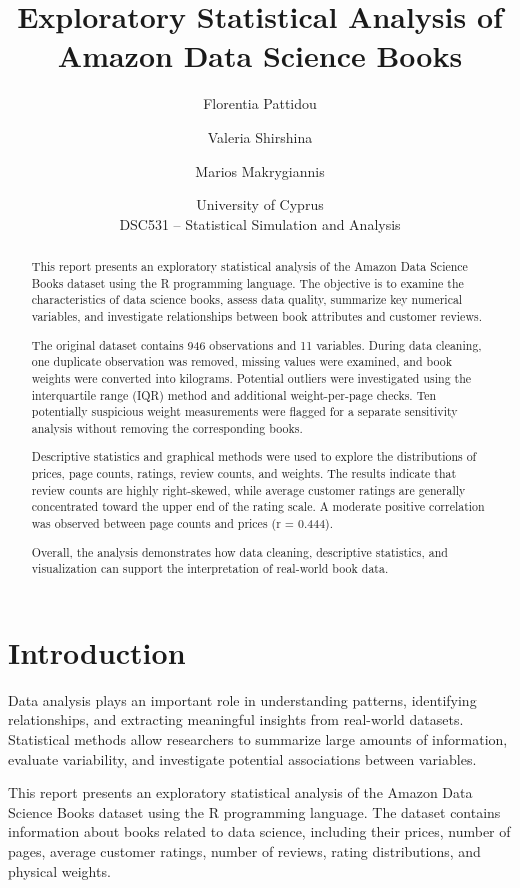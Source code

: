 \documentclass[11pt,a4paper]{article}
\title{Exploratory Statistical Analysis of
Amazon Data Science Books}
\author{
Florentia Pattidou \and
Valeria Shirshina \and
Marios Makrygiannis
}
\date{University of Cyprus\\
DSC531 -- Statistical Simulation and Analysis}
\begin{document}
\maketitle
\newpage
\begin{abstract}
This report presents an exploratory statistical analysis of the Amazon Data Science Books dataset using the R programming language. The objective is to examine the characteristics of data science books, assess data quality, summarize key numerical variables, and investigate relationships between book attributes and customer reviews. 

The original dataset contains 946 observations and 11 variables. During data cleaning, one duplicate observation was removed, missing values were examined, and book weights were converted into kilograms. Potential outliers were investigated using the interquartile range (IQR) method and additional weight-per-page checks. Ten potentially suspicious weight measurements were flagged for a separate sensitivity analysis without removing the corresponding books.

Descriptive statistics and graphical methods were used to explore the distributions of prices, page counts, ratings, review counts, and weights. The results indicate that review counts are highly right-skewed, while average customer ratings are generally concentrated toward the upper end of the rating scale. A moderate positive correlation was observed between page counts and prices (r = 0.444).

Overall, the analysis demonstrates how data cleaning, descriptive statistics, and visualization can support the interpretation of real-world book data.

\end{abstract}
\newpage
\tableofcontents
\newpage
\section{Introduction}
Data analysis plays an important role in understanding patterns, identifying relationships, and extracting meaningful insights from real-world datasets. Statistical methods allow researchers to summarize large amounts of information, evaluate variability, and investigate potential associations between variables.

This report presents an exploratory statistical analysis of the Amazon Data Science Books dataset using the R programming language. The dataset contains information about books related to data science, including their prices, number of pages, average customer ratings, number of reviews, rating distributions, and physical weights.
\end{document}
